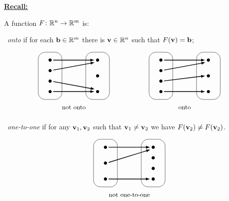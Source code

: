 {\newpage




\underline{\bf Recall:} 

\vskip 5mm

A function $F \colon {\mathbb R}^{n} \to {\mathbb R}^{m}$ is: 

\textbullet\ \emph{onto} if for each ${\bf b} \in {\mathbb R}^{m}$ there is ${\bf v}\in {\mathbb R}^{n}$
such that $F({\bf v}) = {\bf b}$; 


\begin{equation*}
\begin{tikzpicture}[scale=0.8]
\begin{scope}
\draw[rounded corners=10pt] (-0.25,0) rectangle (1.25,3);
\draw[rounded corners=10pt] (2.75,0) rectangle (4.25,3);
\foreach \x in {0, 1, 2}{
\fill (3.5, {0.5 + \x}) circle (0.1);
}
\foreach \x in {0, 1, 2, 3}{
\fill (0.5, {0.5 + (2/3)*\x}) circle (0.1);
}
\draw[line width = 1, ->, >=latex] (0.7, 2.5) -- (3.3, 2.5); 
\draw[line width = 1, ->, >=latex] (0.7, 4/3 + 0.53) -- (3.32, 2.35); 
\draw[line width = 1, ->, >=latex] (0.7, 2/3 + 0.47) -- (3.32, 0.65); 
\draw[line width = 1, ->, >=latex] (0.7, 0.5) -- (3.3, 0.5); 
\node at (2, -0.5) {\small not onto};
\end{scope}


\begin{scope}[xshift = 70mm]
\draw[rounded corners=10pt] (-0.25,0) rectangle (1.25,3);
\draw[rounded corners=10pt] (2.75,0) rectangle (4.25,3);
\foreach \x in {0, 1, 2}{
\fill (3.5, {0.5 + \x}) circle (0.1);
}
\foreach \x in {0, 1, 2, 3}{
\fill (0.5, {0.5 + (2/3)*\x}) circle (0.1);
}
\draw[line width = 1, ->, >=latex] (0.7, 2.5) -- (3.3, 2.5); 
\draw[line width = 1, ->, >=latex] (0.7, 4/3 + 0.53) -- (3.32, 2.35); 
\draw[line width = 1, ->, >=latex] (0.7, 2/3 + 0.51) -- (3.3, 1.5); 
\draw[line width = 1, ->, >=latex] (0.7, 0.5) -- (3.3, 0.5); 
\node at (2, -0.5) {\small onto};
\end{scope}


\end{tikzpicture}
\end{equation*}



\textbullet\ \emph{one-to-one} if for any ${\bf v}_{1}, {\bf v}_{2}$ such that ${\bf v}_{1}\neq {\bf v}_{2}$ 
we have $F({\bf v}_{2}) \neq F({\bf v}_{2})$.

\begin{equation*}
\begin{tikzpicture}[scale =0.8]
\begin{scope}
\draw[, rounded corners=10pt] (-0.25,0) rectangle (1.25,3);
\draw[, rounded corners=10pt] (2.75,0) rectangle (4.25,3);
\foreach \x in {0, 1, 2}{
\fill (0.5, {0.5 + \x}) circle (0.1);
}
\foreach \x in {0, 1, 2, 3}{
\fill (3.5, {0.5 + (2/3)*\x}) circle (0.1);
}
\draw[line width = 1, ->, >=latex] (0.7, 2.5) -- (3.3, 2.5); 
\draw[line width = 1, ->, >=latex] (0.7, 1.54) -- (3.32, 2.35); 
\draw[line width = 1, ->, >=latex] (0.7, 0.5) -- (3.3, 0.5); 
\node at (2, -0.5) {\small not  one-to-one};
\end{scope}


\end{tikzpicture}
\end{equation*}}
